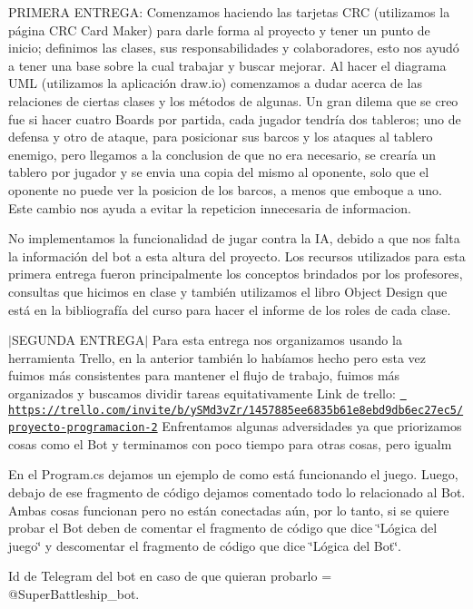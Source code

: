 PRIMERA ENTREGA\+: Comenzamos haciendo las tarjetas CRC (utilizamos la página CRC Card Maker) para darle forma al proyecto y tener un punto de inicio; definimos las clases, sus responsabilidades y colaboradores, esto nos ayudó a tener una base sobre la cual trabajar y buscar mejorar. Al hacer el diagrama UML (utilizamos la aplicación draw.\+io) comenzamos a dudar acerca de las relaciones de ciertas clases y los métodos de algunas. Un gran dilema que se creo fue si hacer cuatro Boards por partida, cada jugador tendría dos tableros; uno de defensa y otro de ataque, para posicionar sus barcos y los ataques al tablero enemigo, pero llegamos a la conclusion de que no era necesario, se crearía un tablero por jugador y se envia una copia del mismo al oponente, solo que el oponente no puede ver la posicion de los barcos, a menos que emboque a uno. Este cambio nos ayuda a evitar la repeticion innecesaria de informacion.

No implementamos la funcionalidad de jugar contra la IA, debido a que nos falta la información del bot a esta altura del proyecto. Los recursos utilizados para esta primera entrega fueron principalmente los conceptos brindados por los profesores, consultas que hicimos en clase y también utilizamos el libro Object Design que está en la bibliografía del curso para hacer el informe de los roles de cada clase.

$\vert$\+SEGUNDA ENTREGA$\vert$ Para esta entrega nos organizamos usando la herramienta Trello, en la anterior también lo habíamos hecho pero esta vez fuimos más consistentes para mantener el flujo de trabajo, fuimos más organizados y buscamos dividir tareas equitativamente Link de trello\+: \href{https://trello.com/invite/b/ySMd3vZr/1457885ee6835b61e8ebd9db6ec27ec5/proyecto-programacion-2}{\texttt{ https\+://trello.\+com/invite/b/y\+SMd3v\+Zr/1457885ee6835b61e8ebd9db6ec27ec5/proyecto-\/programacion-\/2}} Enfrentamos algunas adversidades ya que priorizamos cosas como el Bot y terminamos con poco tiempo para otras cosas, pero igualm

En el Program.\+cs dejamos un ejemplo de como está funcionando el juego. Luego, debajo de ese fragmento de código dejamos comentado todo lo relacionado al Bot. Ambas cosas funcionan pero no están conectadas aún, por lo tanto, si se quiere probar el Bot deben de comentar el fragmento de código que dice \char`\"{}\+Lógica del juego\char`\"{} y descomentar el fragmento de código que dice \char`\"{}\+Lógica del Bot\char`\"{}.

Id de Telegram del bot en caso de que quieran probarlo = @\+Super\+Battleship\+\_\+bot. 
